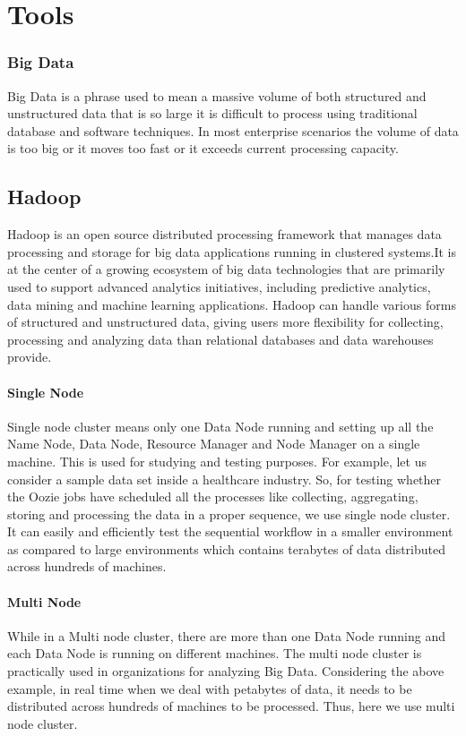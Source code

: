 \chapter{Tools}

\subsection{Big Data}
Big Data is a phrase used to mean a massive volume of both structured and unstructured data that is so large it is difficult to process using traditional database and software techniques. In most enterprise scenarios the volume of data is too big or it moves too fast or it exceeds current processing capacity.

\section{Hadoop}
Hadoop is an open source distributed processing framework that manages data processing and storage for big data applications running in clustered systems.It is at the center of a growing ecosystem of big data technologies that are primarily used to support advanced analytics initiatives, including predictive analytics, data mining and machine learning applications. Hadoop can handle various forms of structured and unstructured data, giving users more flexibility for collecting, processing and analyzing data than relational databases and data warehouses provide.


\subsubsection{Single Node} 
Single node cluster means only one Data Node running and setting up all the Name Node, Data Node, Resource Manager and Node Manager on a single machine. This is used for studying and testing purposes. For example, let us consider a sample data set inside a healthcare industry. So, for testing whether the Oozie jobs have scheduled all the processes like collecting, aggregating, storing and processing the data in a proper sequence, we use single node cluster. It can easily and efficiently test the sequential workflow in a smaller environment as compared to large environments which contains terabytes of data distributed across hundreds of machines. 
\subsubsection{Multi Node} 
While in a Multi node cluster, there are more than one Data Node running and each Data Node is running on different machines. The multi node cluster is practically used in organizations for analyzing Big Data. Considering the above example, in real time when we deal with petabytes of data, it needs to be distributed across hundreds of machines to be processed. Thus, here we use multi node cluster.

